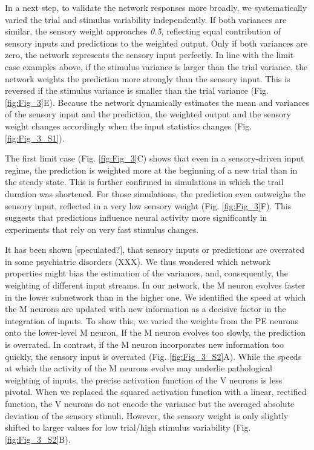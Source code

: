 \documentclass[10pt,a4paper]{article}
\begin{document}
In a next step, to validate the network responses more broadly, we systematically varied the trial and stimulus variability independently. If both variances are similar, the sensory weight approaches \textit{0.5}, reflecting equal contribution of sensory inputs and predictions to the weighted output. Only if both variances are zero, the network represents the sensory input perfectly. In line with the limit case examples above, if the stimulus variance is larger than the trial variance, the network weights the prediction more strongly than the sensory input. This is reversed if the stimulus variance is smaller than the trial variance (Fig. \ref{fig:Fig_3}E). Because the network dynamically estimates the mean and variances of the sensory input and the prediction, the weighted output and the sensory weight changes accordingly when the input statistics changes (Fig. \ref{fig:Fig_3_S1}). 

The first limit case (Fig. \ref{fig:Fig_3}C) shows that even in a sensory-driven input regime, the prediction is weighted more at the beginning of a new trial than in the steady state. This is further confirmed in simulations in which the trail duration was shortened. For those simulations, the prediction even outweighs the sensory input, reflected in a very low sensory weight (Fig. \ref{fig:Fig_3}F). This suggests that predictions influence neural activity more significantly in experiments that rely on very fast stimulus changes. 

It has been shown [speculated?], that sensory inputs or predictions are overrated in some psychiatric disorders (XXX). We thus wondered which network properties might bias the estimation of the variances, and, consequently, the weighting of different input streams. In our network, the M neuron evolves faster in the lower subnetwork than in the higher one. We identified the speed at which the M neurons are updated with new information as a decisive factor in the integration of inputs. To show this, we varied the weights from the PE neurons onto the lower-level M neuron. If the M neuron evolves too slowly, the prediction is overrated. In contrast, if the M neuron incorporates new information too quickly, the sensory input is overrated (Fig. \ref{fig:Fig_3_S2}A). While the speeds at which the activity of the M neurons evolve may underlie pathological weighting of inputs, the precise activation function of the V neurons is less pivotal. When we replaced the squared activation function with a linear, rectified function, the V neurons do not encode the variance but the averaged absolute deviation of the sensory stimuli. However, the sensory weight is only slightly shifted to larger values for low trial/high stimulus variability (Fig. \ref{fig:Fig_3_S2}B). 
\end{document}
